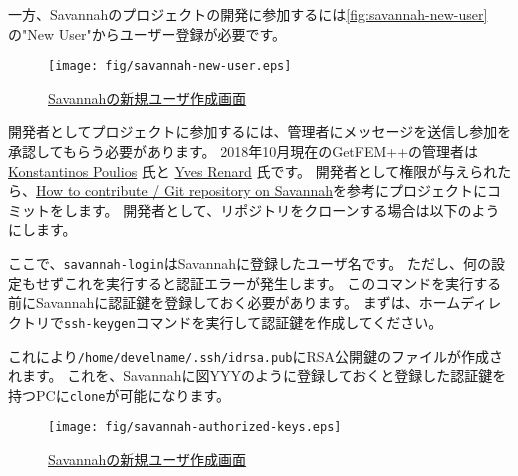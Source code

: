 \documentclass{../../style/ltjoc}
\begin{document}
一方、Savannahのプロジェクトの開発に参加するには\autoref{fig:savannah-new-user}の"New User"からユーザー登録が必要です。
%
\begin{figure}[htbp]
\centering
\texttt{[image: fig/savannah-new-user.eps]}
\caption{\href{https://savannah.gnu.org/account/register.php}{Savannahの新規ユーザ作成画面}}
\label{fig:savannah-new-user}
\end{figure}
開発者としてプロジェクトに参加するには、管理者にメッセージを送信し参加を承認してもらう必要があります。
2018年10月現在のGetFEM++の管理者は \href{http://www.dtu.dk/english/service/phonebook/person?id=65472&tab=2&qt=dtupublicationquery}{Konstantinos Poulios} 氏と \href{http://math.univ-lyon1.fr/~renard/}{Yves Renard} 氏です。
開発者として権限が与えられたら、\href{http://getfem.org/project/index.html}{How to contribute / Git repository on Savannah}を参考にプロジェクトにコミットをします。
開発者として、リポジトリをクローンする場合は以下のようにします。
\begin{shbox}
\end{shbox}
ここで、\texttt{savannah-login}はSavannahに登録したユーザ名です。
ただし、何の設定もせずこれを実行すると認証エラーが発生します。
このコマンドを実行する前にSavannahに認証鍵を登録しておく必要があります。
まずは、ホームディレクトリで\texttt{ssh-keygen}コマンドを実行して認証鍵を作成してください。
\begin{shbox}
  \shline{}{}
\end{shbox}
これにより\texttt{/home/develname/.ssh/id\textunderscore{}rsa.pub}にRSA公開鍵のファイルが作成されます。
これを、Savannahに図YYYのように登録しておくと登録した認証鍵を持つPCに\texttt{clone}が可能になります。
\begin{figure}[htbp]
\centering
\texttt{[image: fig/savannah-authorized-keys.eps]}
\caption{\href{https://savannah.gnu.org/account/register.php}{Savannahの新規ユーザ作成画面}}
\label{fig:savannah-authorized-keys}
\end{figure}
\end{document}
